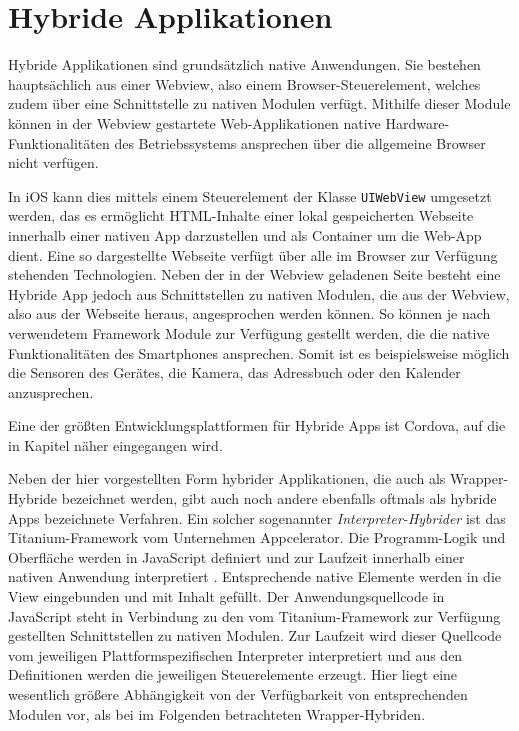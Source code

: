 \section{Hybride Applikationen}
\label{sec:HybrideApplikationen}
%
Hybride Applikationen sind grundsätzlich native Anwendungen. Sie bestehen hauptsächlich aus einer Webview, also einem Browser-Steuerelement, welches zudem über eine Schnittstelle zu nativen Modulen verfügt. Mithilfe dieser Module können in der Webview gestartete Web-Applikationen native Hardware-Funktionalitäten des Betriebssystems ansprechen über die allgemeine Browser nicht verfügen.

In iOS kann dies mittels einem Steuerelement der Klasse \texttt{UIWebView} \cite{uiWebView} umgesetzt werden, das es ermöglicht HTML-Inhalte einer lokal gespeicherten Webseite innerhalb einer nativen App darzustellen und als Container um die Web-App dient. Eine so dargestellte Webseite verfügt über alle im Browser zur Verfügung stehenden Technologien. Neben der in der Webview geladenen Seite besteht eine Hybride App jedoch aus Schnittstellen zu nativen Modulen, die aus der Webview, also aus der Webseite heraus, angesprochen werden können. So können je nach verwendetem Framework Module zur Verfügung gestellt werden, die die native Funktionalitäten des Smartphones ansprechen. Somit ist es beispielsweise möglich die Sensoren des Gerätes, die Kamera, das Adressbuch oder den Kalender anzusprechen. 

Eine der größten Entwicklungsplattformen für Hybride Apps ist Cordova, auf die in Kapitel  näher eingegangen wird.

Neben der hier vorgestellten Form hybrider Applikationen, die auch als Wrapper-Hybride bezeichnet werden, gibt auch noch andere ebenfalls oftmals als hybride Apps bezeichnete Verfahren. Ein solcher sogenannter \emph{Interpreter-Hybrider} ist das Titanium-Framework vom Unternehmen Appcelerator. Die Programm-Logik und Oberfläche werden in JavaScript definiert und zur Laufzeit
innerhalb einer nativen Anwendung interpretiert \cite{titaniumAbout}. Entsprechende
native Elemente werden in die View eingebunden und mit Inhalt gefüllt. Der Anwendungsquellcode in JavaScript steht in Verbindung zu den vom Titanium-Framework zur Verfügung gestellten Schnittstellen zu nativen Modulen. Zur Laufzeit wird dieser Quellcode vom jeweiligen Plattformspezifischen Interpreter interpretiert und aus den Definitionen werden die jeweiligen Steuerelemente erzeugt. Hier liegt eine wesentlich größere Abhängigkeit von der Verfügbarkeit von entsprechenden Modulen vor, als bei im Folgenden betrachteten Wrapper-Hybriden.
%
